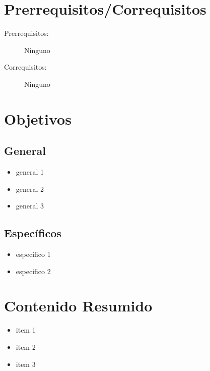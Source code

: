 \documentclass[11pt]{article}
\begin{document}
\section*{Prerrequisitos/Correquisitos}
\begin{description}
\item [Prerrequisitos:] Ninguno
\item[Correquisitos:] Ninguno
\end{description}

\section*{Objetivos}

\subsection*{General}

\begin{itemize}
\item general 1 \item general 2  \item general 3 
\end{itemize}

\subsection*{Específicos}

\begin{itemize}
\item especifico 1 \item especifico 2  
\end{itemize}

\section*{Contenido Resumido}

\begin{itemize}
\item item 1 \item  item 2  \item  item 3  
\end{itemize}

\end{document}
